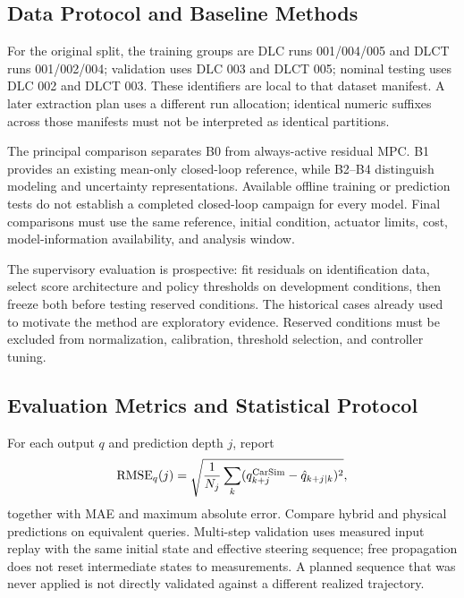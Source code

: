 \documentclass[10pt,journal]{IEEEtran}
\begin{document}
\subsection{Data Protocol and Baseline Methods}
For the original split, the training groups are DLC runs 001/004/005 and DLCT runs 001/002/004; validation uses DLC 003 and DLCT 005; nominal testing uses DLC 002 and DLCT 003. These identifiers are local to that dataset manifest. A later extraction plan uses a different run allocation; identical numeric suffixes across those manifests must not be interpreted as identical partitions.

The principal comparison separates B0 from always-active residual MPC. B1 provides an existing mean-only closed-loop reference, while B2--B4 distinguish modeling and uncertainty representations. Available offline training or prediction tests do not establish a completed closed-loop campaign for every model. Final comparisons must use the same reference, initial condition, actuator limits, cost, model-information availability, and analysis window.

The supervisory evaluation is prospective: fit residuals on identification data, select score architecture and policy thresholds on development conditions, then freeze both before testing reserved conditions. The historical cases already used to motivate the method are exploratory evidence. Reserved conditions must be excluded from normalization, calibration, threshold selection, and controller tuning.

\subsection{Evaluation Metrics and Statistical Protocol}
For each output $q$ and prediction depth $j$, report
\begin{equation}
 {\rm RMSE}_q(j)=\sqrt{\frac{1}{N_j}\sum_k
 (q_{k+j}^{\rm CarSim}-\hat q_{k+j|k})^2},
\end{equation}
together with MAE and maximum absolute error. Compare hybrid and physical predictions on equivalent queries. Multi-step validation uses measured input replay with the same initial state and effective steering sequence; free propagation does not reset intermediate states to measurements. A planned sequence that was never applied is not directly validated against a different realized trajectory.
\end{document}
